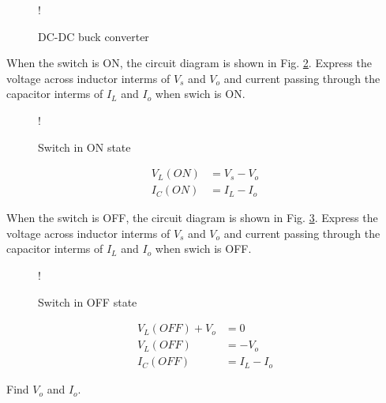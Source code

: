 \documentclass[journal,12pt,twocolumn]{IEEEtran}
\begin{document}
\begin{figure}[!h]
\centering
\resizebox {\columnwidth} {!} {

}
\caption{DC-DC buck converter} 
\label{fig1}
\end{figure}
%
\begin{problem}
When the switch is ON, the circuit diagram is shown in Fig. \ref{fig2}. Express the voltage across inductor interms of $V_{s}$ and $V_{o}$ and current passing through the capacitor interms of $I_{L}$ and $I_{o}$ when swich is ON.  
\end{problem}
\begin{figure}[!h]
       \centering  
 \resizebox {\columnwidth} {!} {

}   
    \caption{Switch in ON state}\label{fig2}
   \end{figure} 
  \solution
  \begin{align*}
  V_{L}(ON) &= V_{s} - V_{o}\\
  I_{C}(ON) &= I_{L} - I_{o}
\end{align*} 
\begin{problem}
When the switch is OFF, the circuit diagram is shown in Fig. \ref{fig3}.  Express the voltage across inductor interms of $V_{s}$ and $V_{o}$ and current passing through the capacitor interms of $I_{L}$ and $I_{o}$ when swich is OFF.  
  \end{problem}
%
 \begin{figure}[!h]
       \centering  
\resizebox {\columnwidth} {!} {

} 
    \caption{Switch in OFF state}\label{fig3}
   \end{figure}
  \solution
  \begin{align*}
  V_{L}(OFF) +  V_{o}&=0\\
  V_{L}(OFF) &= - V_{o}\\
  I_{C}(OFF) &= I_{L} - I_{o}
\end{align*}  
\begin{problem}
Find $V_{o}$ and $I_{o}$.
\end{problem} 
\end{document}
